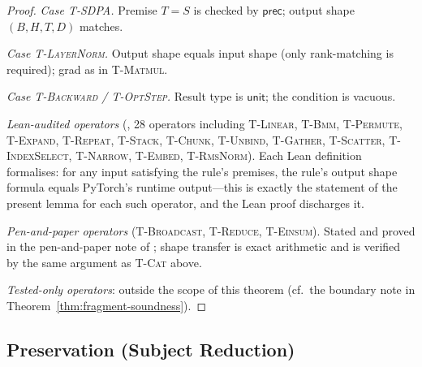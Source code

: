 \begin{proof}
\emph{Case \textsc{T-SDPA}.}
Premise $T=S$ is checked by $\mathsf{prec}$; output shape $(B,H,T,D)$ matches.

\emph{Case \textsc{T-LayerNorm}.}
Output shape equals input shape (only rank-matching is required);
grad as in \textsc{T-Matmul}.

\emph{Case \textsc{T-Backward} / \textsc{T-OptStep}.}
Result type is $\mathsf{unit}$; the condition is vacuous.

\emph{Lean-audited operators}
(, 28 operators including \textsc{T-Linear},
\textsc{T-Bmm}, \textsc{T-Permute}, \textsc{T-Expand}, \textsc{T-Repeat},
\textsc{T-Stack}, \textsc{T-Chunk}, \textsc{T-Unbind},
\textsc{T-Gather}, \textsc{T-Scatter}, \textsc{T-IndexSelect},
\textsc{T-Narrow}, \textsc{T-Embed}, \textsc{T-RmsNorm}).
Each Lean definition formalises: for any input satisfying the rule's premises,
the rule's output shape formula equals PyTorch's runtime output---this is exactly
the statement of the present lemma for each such operator, and the Lean proof
discharges it.

\emph{Pen-and-paper operators} (\textsc{T-Broadcast}, \textsc{T-Reduce},
\textsc{T-Einsum}).
Stated and proved in the pen-and-paper note of
; shape transfer is exact arithmetic and
is verified by the same argument as \textsc{T-Cat} above.

\emph{Tested-only operators}: outside the scope of this theorem
(cf.\ the boundary note in Theorem~\ref{thm:fragment-soundness}).
\end{proof}

\subsection{Preservation (Subject Reduction)}

